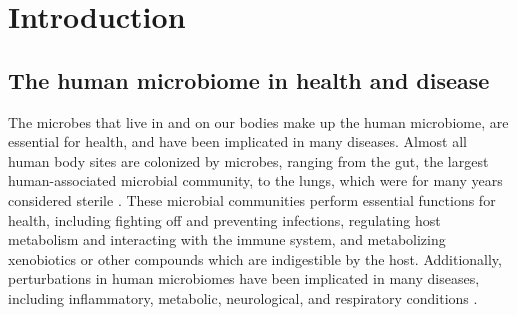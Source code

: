 
\chapter{Introduction}

\section{The human microbiome in health and disease}

The microbes that live in and on our bodies make up the human microbiome, are essential for health, and have been implicated in many diseases.
Almost all human body sites are colonized by microbes, ranging from the gut, the largest human-associated microbial community, to the lungs, which were for many years considered sterile \cite{sender-2016-bhratio,beck-2012-lungmicrobiome}.
These microbial communities perform essential functions for health, including fighting off and preventing infections, regulating host metabolism and interacting with the immune system, and metabolizing xenobiotics or other compounds which are indigestible by the host.
Additionally, perturbations in human microbiomes have been implicated in many diseases, including inflammatory, metabolic, neurological, and respiratory conditions \cite{beck-2012-lungmicrobiome,ibd-papa,ob-TBD,hsiao-2013-autism}.

